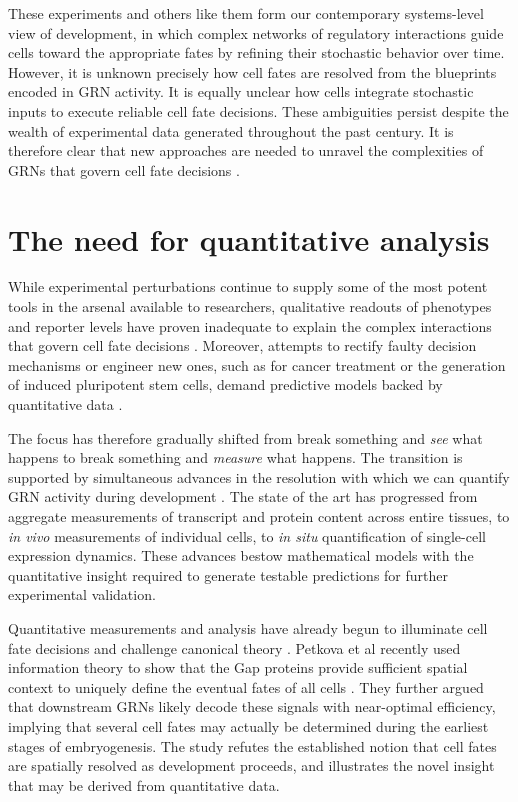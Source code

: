 These experiments and others like them form our contemporary systems-level view of development, in which complex networks of regulatory interactions guide cells toward the appropriate fates by refining their stochastic behavior over time. However, it is unknown precisely how cell fates are resolved from the blueprints encoded in GRN activity. It is equally unclear how cells integrate stochastic inputs to execute reliable cell fate decisions. These ambiguities persist despite the wealth of experimental data generated throughout the past century. It is therefore clear that new approaches are needed to unravel the complexities of GRNs that govern cell fate decisions \cite{Oates2009}.

\section{The need for quantitative analysis}

While experimental perturbations continue to supply some of the most potent tools in the arsenal available to researchers, qualitative readouts of phenotypes and reporter levels have proven inadequate to explain the complex interactions that govern cell fate decisions \cite{Oates2009}. Moreover, attempts to rectify faulty decision mechanisms or engineer new ones, such as for cancer treatment or the generation of induced pluripotent stem cells, demand predictive models backed by quantitative data \cite{Lazebnik2004}.

The focus has therefore gradually shifted from break something and \textit{see} what happens to break something and \textit{measure} what happens. The transition is supported by simultaneous advances in the resolution with which we can quantify GRN activity during development \cite{Sbalzarini2016}. The state of the art has progressed from aggregate measurements of transcript and protein content across entire tissues, to \emph{in vivo} measurements of individual cells, to \emph{in situ} quantification of single-cell expression dynamics. These advances bestow mathematical models with the quantitative insight required to generate testable predictions for further experimental validation.

Quantitative measurements and analysis have already begun to illuminate cell fate decisions and challenge canonical theory \cite{Frick2017,Petkova2019,Wolff2018}. Petkova et al recently used information theory to show that the Gap proteins provide sufficient spatial context to uniquely define the eventual fates of all cells \cite{Petkova2019}. They further argued that downstream GRNs likely decode these signals with near-optimal efficiency, implying that several cell fates may actually be determined during the earliest stages of embryogenesis. The study refutes the established notion that cell fates are spatially resolved as development proceeds, and illustrates the novel insight that may be derived from quantitative data.

